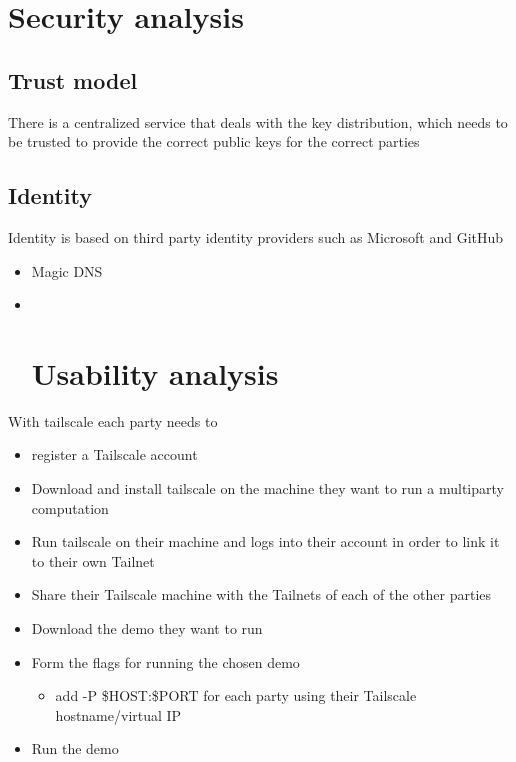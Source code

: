 \hypertarget{thesis__070-tailscale.md__security-analysis}{%
\section{Security
analysis}\label{thesis__070-tailscale.md__security-analysis}}

\hypertarget{thesis__070-tailscale.md__trust-model}{%
\subsection{Trust model}\label{thesis__070-tailscale.md__trust-model}}

There is a centralized service that deals with the key distribution,
which needs to be trusted to provide the correct public keys for the
correct parties

\hypertarget{thesis__070-tailscale.md__identity}{%
\subsection{Identity}\label{thesis__070-tailscale.md__identity}}

Identity is based on third party identity providers such as Microsoft
and GitHub

\begin{itemize}
\item
  Magic DNS
\item ~
  \hypertarget{thesis__070-tailscale.md__usability-analysis}{%
  \section{Usability
  analysis}\label{thesis__070-tailscale.md__usability-analysis}}
\end{itemize}

With tailscale each party needs to

\begin{itemize}
\tightlist
\item
  register a Tailscale account
\item
  Download and install tailscale on the machine they want to run a
  multiparty computation
\item
  Run tailscale on their machine and logs into their account in order to
  link it to their own Tailnet
\item
  Share their Tailscale machine with the Tailnets of each of the other
  parties
\item
  Download the demo they want to run
\item
  Form the flags for running the chosen demo

  \begin{itemize}
  \tightlist
  \item
    add -P \$HOST:\$PORT for each party using their Tailscale
    hostname/virtual IP
  \end{itemize}
\item
  Run the demo
\end{itemize}

